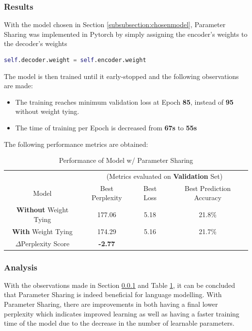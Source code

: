 \documentclass[sigconf,nonacm=true]{acmart}
\begin{document}
\subsubsection{Results}
\label{subsubsection:weighttieresults}
With the model chosen in Section \ref{subsubsection:chosenmodel}, Parameter Sharing was implemented in Pytorch by simply assigning the encoder's weights to the decoder's weights
\begin{lstlisting}[language=Python]
self.decoder.weight = self.encoder.weight
\end{lstlisting}
The model is then trained until it early-stopped and the following observations are made:
\begin{itemize}
	\item The training reaches minimum validation loss at Epoch \textbf{85}, instead of \textbf{95} without weight tying.
	\item The time of training per Epoch is decreased from \textbf{67s} to \textbf{55s}
\end{itemize}
The following performance metrics are obtained:

\begin{table}[h]
	\begin{adjustbox}{width=\columnwidth}
		\begin{tabular}{cccc}
			\toprule
			&\multicolumn{3}{c}{(Metrics evaluated on \textbf{Validation} Set)}\\
			Model &Best Perplexity&Best Loss&Best Prediction Accuracy\\
			\midrule
			\textbf{Without} Weight Tying & 177.06 & 5.18 & 21.8\% \\
			\textbf{With} Weight Tying & 174.29 & 5.16 & 21.7\% \\
			\midrule
			$\Delta$Perplexity Score & \textbf{-2.77}\\
			\bottomrule
		\end{tabular}
	\end{adjustbox}
	\caption{Performance of Model w/ Parameter Sharing}
	\label{tab:weighttiecomp}
\end{table}

\subsubsection{Analysis}
With the observations made in Section \ref{subsubsection:weighttieresults} and Table \ref{tab:weighttiecomp}, it can be concluded that Parameter Sharing is indeed beneficial for language modelling. With Parameter Sharing, there are improvements in both having a final lower perplexity which indicates improved learning as well as having a faster training time of the model due to the decrease in the number of learnable parameters.
\end{document}
